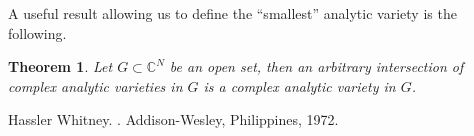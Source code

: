 \documentclass[12pt]{article}
\theoremstyle{theorem}
\newtheorem*{thm}{Theorem}
\theoremstyle{definition}
\begin{document}
A useful result allowing us to define the ``smallest'' analytic variety is
the following.

\begin{thm}
Let $G \subset {\mathbb{C}}^N$ be an open set, then an arbitrary intersection
of complex analytic varieties in $G$ is a complex analytic variety in $G$.
\end{thm}

\begin{thebibliography}{9}
Hassler Whitney.
{\em {}}.
Addison-Wesley, Philippines, 1972.
\end{thebibliography}
\end{document}
